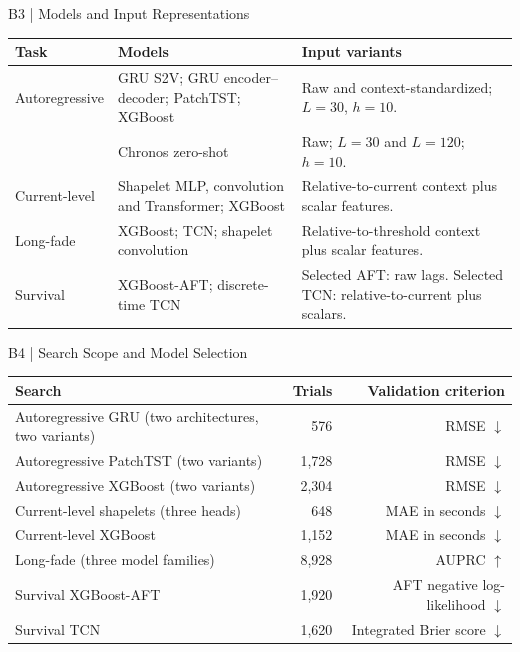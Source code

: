 \begin{frame}[noframenumbering]{B3 | Models and Input Representations}
\small
\renewcommand{\arraystretch}{1.45}
\begin{tabularx}{\textwidth}{@{}>{\raggedright\arraybackslash}p{27mm}>{\raggedright\arraybackslash}p{48mm}>{\raggedright\arraybackslash}X@{}}
\toprule
Task & Models & Input variants\\\midrule
\textcolor{forecast}{Autoregressive} & GRU S2V; GRU encoder--decoder; PatchTST; XGBoost & Raw and context-standardized;\newline $L=30$, $h=10$.\\
 & Chronos zero-shot & Raw; $L=30$ and $L=120$; $h=10$.\\
\textcolor{current}{Current-level} & Shapelet MLP, convolution and Transformer; XGBoost & Relative-to-current context plus scalar features.\\
\textcolor{longfade}{Long-fade} & XGBoost; TCN; shapelet convolution & Relative-to-threshold context plus scalar features.\\
\textcolor{survival}{Survival} & XGBoost-AFT; discrete-time TCN & Selected AFT: raw lags. Selected TCN: relative-to-current plus scalars.\\
\bottomrule
\end{tabularx}
\end{frame}

\begin{frame}[noframenumbering]{B4 | Search Scope and Model Selection}
\small
\renewcommand{\arraystretch}{1.24}
\begin{tabularx}{\textwidth}{@{}Xrr@{}}
\toprule
Search & Trials & Validation criterion\\\midrule
Autoregressive GRU (two architectures, two variants) & 576 & RMSE $\downarrow$\\
Autoregressive PatchTST (two variants) & 1,728 & RMSE $\downarrow$\\
Autoregressive XGBoost (two variants) & 2,304 & RMSE $\downarrow$\\
Current-level shapelets (three heads) & 648 & MAE in seconds $\downarrow$\\
Current-level XGBoost & 1,152 & MAE in seconds $\downarrow$\\
Long-fade (three model families) & 8,928 & AUPRC $\uparrow$\\
Survival XGBoost-AFT & 1,920 & AFT negative log-likelihood $\downarrow$\\
Survival TCN & 1,620 & Integrated Brier score $\downarrow$\\
\bottomrule
\end{tabularx}
\end{frame}

